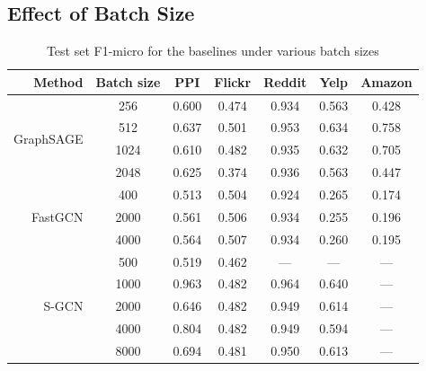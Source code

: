 \subsection{Effect of Batch Size}
\label{appendix: batch size}
\begin{table}[!ht]
\caption{Test set F1-micro for the baselines under various batch sizes}
    \centering
    \begin{tabular}{rcccccc}
        \toprule
        {Method} & {Batch size} & {PPI} & {Flickr} & {Reddit} & {Yelp} & Amazon\\
        \midrule
        \midrule
        \multirow{4}{*}{GraphSAGE} & 256 & 0.600 & 0.474 & 0.934 & 0.563 & 0.428\\
         & 512\footnotemark[1] & 0.637 & 0.501 & 0.953 & 0.634 & 0.758\\
         & 1024 & 0.610 & 0.482 & 0.935 & 0.632 & 0.705\\
         & 2048 & 0.625 & 0.374 & 0.936 & 0.563 & 0.447\\
         \midrule
        \multirow{3}{*}{FastGCN} & 400\footnotemark[1] & 0.513 & 0.504 & 0.924 & 0.265 & 0.174\\
        & 2000 & 0.561 & 0.506  & 0.934 & 0.255 & 0.196\\
        & 4000 & 0.564 & 0.507  & 0.934 & 0.260 & 0.195\\
        \midrule
        \multirow{5}{*}{S-GCN} & 500 & 0.519 & 0.462 & ---\footnotemark[5] & ---\footnotemark[5] & ---\footnotemark[3]\\
         & 1000\footnotemark[1] & 0.963 & 0.482 & 0.964 & 0.640 & ---\footnotemark[3] \\
         & 2000 & 0.646 & 0.482 & 0.949 & 0.614 & ---\footnotemark[3] \\
         & 4000 & 0.804 & 0.482 & 0.949 & 0.594 & ---\footnotemark[3] \\
         & 8000 & 0.694 & 0.481 & 0.950 & 0.613 & ---\footnotemark[3] \\

\end{tabular}
\end{table}
